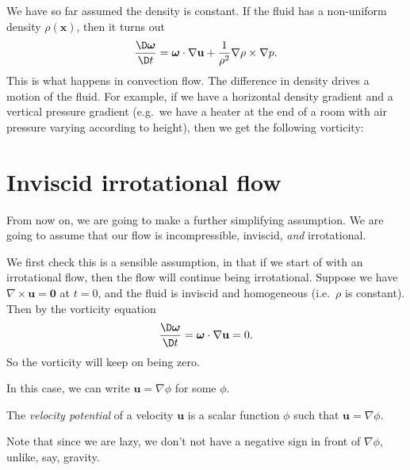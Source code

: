 \documentclass[a4paper]{article}
\begin{document}
We have so far assumed the density is constant. If the fluid has a non-uniform density $\rho(\mathbf{x})$, then it turns out
\[
  \frac{\D \boldsymbol\omega}{\D t} = \boldsymbol\omega \cdot \nabla \mathbf{u} + \frac{1}{\rho^2} \nabla \rho \times \nabla p.
\]
This is what happens in convection flow. The difference in density drives a motion of the fluid. For example, if we have a horizontal density gradient and a vertical pressure gradient (e.g.\ we have a heater at the end of a room with air pressure varying according to height), then we get the following vorticity:
\begin{center}
\end{center}

\section{Inviscid irrotational flow}
From now on, we are going to make a further simplifying assumption. We are going to assume that our flow is incompressible, inviscid, \emph{and} irrotational.

We first check this is a sensible assumption, in that if we start of with an irrotational flow, then the flow will continue being irrotational. Suppose we have $\nabla \times \mathbf{u} = \mathbf{0}$ at $t = 0$, and the fluid is inviscid and homogeneous (i.e.\ $\rho$ is constant). Then by the vorticity equation
\[
  \frac{\D \boldsymbol\omega}{\D t} = \boldsymbol\omega \cdot \nabla \mathbf{u} = 0.
\]
So the vorticity will keep on being zero.

In this case, we can write $\mathbf{u} = \nabla \phi$ for some $\phi$.
\begin{defi}
  The \emph{velocity potential} of a velocity $\mathbf{u}$ is a scalar function $\phi$ such that $\mathbf{u} = \nabla \phi$.
\end{defi}
Note that since we are lazy, we don't not have a negative sign in front of $\nabla \phi$, unlike, say, gravity.
\end{document}
